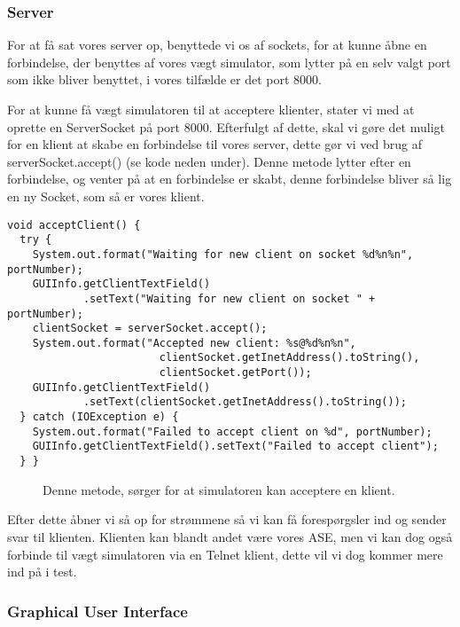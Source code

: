 \documentclass[a4paper]{article}
\newenvironment{changemargin}[2]{%
\begin{list}{}{%
\setlength{\topsep}{0pt}%
\setlength{\leftmargin}{#1}%
\setlength{\rightmargin}{#2}%
\setlength{\listparindent}{\parindent}%
\setlength{\itemindent}{\parindent}%
\setlength{\parsep}{\parskip}%
}%
\item[]}{\end{list}}
\begin{document}

\subsubsection{Server} %

For at få sat vores server op, benyttede vi os af sockets, for at kunne åbne en forbindelse, der benyttes af vores vægt simulator, som lytter på en selv valgt port som ikke bliver benyttet, i vores tilfælde er det port 8000.

For at kunne få vægt simulatoren til at acceptere klienter, stater vi med at oprette en ServerSocket på port 8000. Efterfulgt af dette, skal vi gøre det muligt for en klient at skabe en forbindelse til vores server, dette gør vi ved brug af serverSocket.accept() (se kode neden under). Denne metode lytter efter en forbindelse, og venter på at en forbindelse er skabt, denne forbindelse bliver så lig en ny Socket, som så er vores klient. 

\begin{changemargin}{-1.5cm}{-1.5cm}
\begin{lstlisting}
void acceptClient() {
  try {
    System.out.format("Waiting for new client on socket %d%n%n", portNumber);
    GUIInfo.getClientTextField()
            .setText("Waiting for new client on socket " + portNumber);
    clientSocket = serverSocket.accept();
    System.out.format("Accepted new client: %s@%d%n%n",
                        clientSocket.getInetAddress().toString(),
                        clientSocket.getPort());
    GUIInfo.getClientTextField()
            .setText(clientSocket.getInetAddress().toString());
  } catch (IOException e) {
    System.out.format("Failed to accept client on %d", portNumber);
    GUIInfo.getClientTextField().setText("Failed to accept client");
  } }
\end{lstlisting}
\end{changemargin}
\begin{figure}[H]
  \caption{Denne metode, sørger for at simulatoren kan acceptere en klient.}
\end{figure}

Efter dette åbner vi så op for strømmene så vi kan få forespørgsler ind og sender svar til klienten. Klienten kan blandt andet være vores ASE, men vi kan dog også forbinde til vægt simulatoren via en Telnet klient, dette vil vi dog kommer mere ind på i test.


\subsubsection{Graphical User Interface} %
\end{document}
